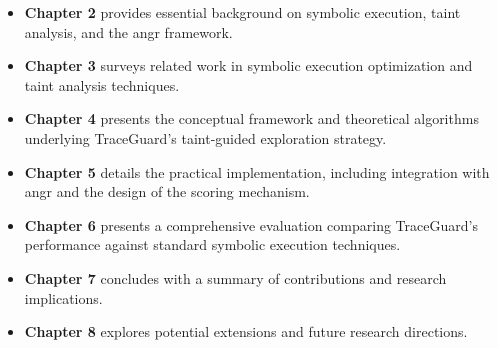 \begin{itemize}
    \item \textbf{Chapter 2} provides essential background on symbolic execution, taint analysis, and the angr framework.
    \item \textbf{Chapter 3} surveys related work in symbolic execution optimization and taint analysis techniques.
    \item \textbf{Chapter 4} presents the conceptual framework and theoretical algorithms underlying TraceGuard's taint-guided exploration strategy.
    \item \textbf{Chapter 5} details the practical implementation, including integration with angr and the design of the scoring mechanism.
    \item \textbf{Chapter 6} presents a comprehensive evaluation comparing TraceGuard's performance against standard symbolic execution techniques.
    \item \textbf{Chapter 7} concludes with a summary of contributions and research implications.
    \item \textbf{Chapter 8} explores potential extensions and future research directions.
\end{itemize}
